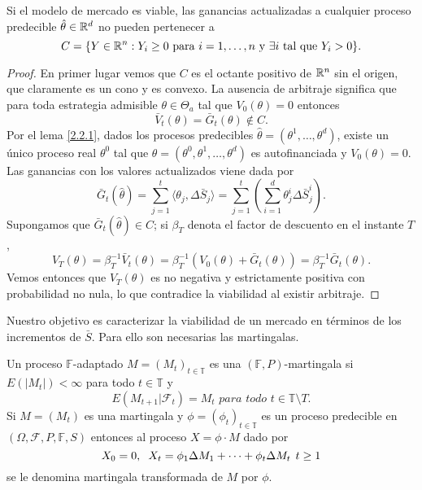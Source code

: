 \bigskip
\begin{lemaBox}\label{3.2.1}
	Si el modelo de mercado es viable, las ganancias actualizadas a cualquier proceso predecible $ \hat{\theta} \in \mathbb{R} ^d $ no pueden pertenecer a 
	\[
	C = \{Y \in \mathbb{R}^n: Y_i \geq 0\text{ para } i=1,\dots,n \text{ y } \exists i \text{ tal que } Y_i > 0\}.
	\]
\end{lemaBox}
\begin{proof}
	En primer lugar vemos que $ C $ es el octante positivo de $ \mathbb{R}^n $ sin el origen, que claramente es un cono y es convexo. La ausencia de arbitraje significa que para toda estrategia admisible $ \theta \in \Theta_a $ tal que $ V_0(\theta) = 0 $ entonces
	\[
	\bar{V}_t(\theta) = \bar{G}_t (\theta) \notin C.
	\]
	Por el lema \ref{2.2.1}, dados los procesos predecibles $ \hat{\theta} = (\theta^1, \dots,\theta^d) $, existe un único proceso real $ \theta^0 $ tal que $ \theta = (\theta^0, \theta^1,\dots, \theta^d) $ es autofinanciada y $ V_0(\theta) = 0 $. Las ganancias con los valores actualizados viene dada por
	\[
	\bar{G}_t(\hat{\theta}) = \sum_{j=1}^{t} \langle \theta_j, \Delta \bar{S}_j \rangle =   \sum_{j=1}^{t} \left( \sum_{i=1}^{d} \theta_j^i \Delta \bar{S}_j^i  \right).
	\]
	Supongamos que $ \bar{G}_t(\hat{\theta}) \in C $; si $ \beta_T $ denota el factor de descuento en el instante $ T $,
	\[
	V_T(\theta) = \beta_T^{-1} \bar{V}_t(\theta) = \beta_T^{-1}(V_0 (\theta) + \bar{G}_t(\theta)) = \beta_T^{-1}\bar{G}_t(\theta).
	\]
	Vemos entonces que $ V_T(\theta) $ es no negativa y estrictamente positiva con probabilidad no nula, lo que contradice la viabilidad al existir arbitraje.
\end{proof}
\bigskip
Nuestro objetivo es caracterizar la viabilidad de un mercado en términos de los incrementos de $ \bar{S} $. Para ello son necesarias las martingalas.
\bigskip
\begin{definicion}
	Un proceso $ \mathbb{F} $-adaptado $ M = (M_t)_{t\in \mathbb{T}} $ es una $ ( \mathbb{F},P)$-mar\-tingala si $ E(|M_t|) < \infty $ para todo $ t \in \mathbb{T} $ y 
	\[
	E(M_{t+1}|\mathcal{F}_t) = M_t \textit{ para todo } t \in \mathbb{T}\setminus{T}.
	\]
	Si $ M = (M_t) $ es una martingala y $ \phi = (\phi_t)_{t\in \mathbb{T}} $ es un proceso predecible en $ (\Omega, \mathcal{F}, P, \mathbb{F}, S) $ entonces al proceso $ X = \phi \cdot M $ dado por
	\[
	X_0=0, \hspace{2mm}X_t = \phi_1\Delta M_1+\cdots+ \phi_t\Delta M_t \hspace{1.5mm} t \geq1
	\]
	se le denomina martingala transformada de $ M $ por $ \phi $.
\end{definicion}

